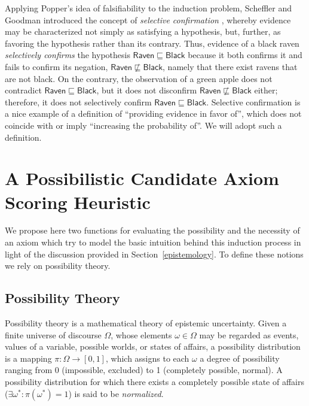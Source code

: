 \documentclass{llncs}
\begin{document}
Applying Popper's idea of falsifiability to the induction problem,
Scheffler and Goodman introduced the concept of \emph{selective confirmation}
\cite{SchefflerGoodman1972}, whereby evidence may be characterized
not simply as satisfying a hypothesis, but, further, as favoring the hypothesis
rather than its contrary.
Thus, evidence of a black raven \emph{selectively confirms} the hypothesis
$\mathsf{Raven} \sqsubseteq \mathsf{Black}$ because it both confirms it and fails to confirm its
negation, $\mathsf{Raven} \not\sqsubseteq \mathsf{Black}$, namely
that there exist ravens that are not black. On the contrary, the observation of
a green apple does not contradict $\mathsf{Raven} \sqsubseteq \mathsf{Black}$,
but it does not disconfirm $\mathsf{Raven} \not\sqsubseteq \mathsf{Black}$
either; therefore, it does not selectively confirm $\mathsf{Raven} \sqsubseteq \mathsf{Black}$.
Selective confirmation is a nice example of a definition of ``providing evidence in favor of'',
which does not coincide with or imply ``increasing the probability of''.
We will adopt such a definition.


\section{A Possibilistic Candidate Axiom Scoring Heuristic}
\label{possibility-theory}

We propose here two functions for evaluating the possibility and the necessity of
an axiom which try to model the basic intuition behind this induction process
in light of the discussion provided in Section~\ref{epistemology}.
To define these notions we rely on possibility theory.


\subsection{Possibility Theory}
\label{PossibilityTheory}

Possibility theory \cite{Zadeh1978} is a mathematical theory of epistemic uncertainty.
Given a finite universe of discourse $\Omega$, whose elements $\omega\in\Omega$
may be regarded as events, values of a variable, possible worlds, or states of affairs,
a possibility distribution is a mapping $\pi: \Omega \to [0, 1]$,
which assigns to each $\omega$ a degree of possibility ranging from 0 (impossible,
excluded) to 1 (completely possible, normal).
A possibility distribution for  which there exists a completely possible state of
affairs ($\exists \omega^*: \pi(\omega^*) = 1$) is said to be \emph{normalized}.
\end{document}
